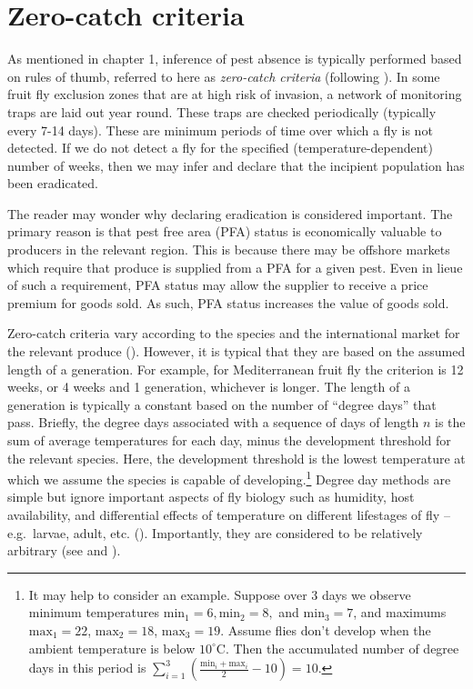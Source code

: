\documentclass[
  oneside]{book}
\begin{document}
\hypertarget{zero-catch-criteria}{%
\section{Zero-catch criteria}\label{zero-catch-criteria}}

As mentioned in chapter 1, inference of pest absence is typically performed based on rules of thumb, referred to here as \emph{zero-catch criteria} (following \citet{meats2005}). In some fruit fly exclusion zones that are at high risk of invasion, a network of monitoring traps are laid out year round. These traps are checked periodically (typically every 7-14 days). These are minimum periods of time over which a fly is not detected. If we do not detect a fly for the specified (temperature-dependent) number of weeks, then we may infer and declare that the incipient population has been eradicated.

The reader may wonder why declaring eradication is considered important. The primary reason is that pest free area (PFA) status is economically valuable to producers in the relevant region. This is because there may be offshore markets which require that produce is supplied from a PFA for a given pest. Even in lieue of such a requirement, PFA status may allow the supplier to receive a price premium for goods sold. As such, PFA status increases the value of goods sold.

Zero-catch criteria vary according to the species and the international market for the relevant produce (\citet{meats2005}). However, it is typical that they are based on the assumed length of a generation. For example, for Mediterranean fruit fly the criterion is 12 weeks, or 4 weeks and 1 generation, whichever is longer. The length of a generation is typically a constant based on the number of ``degree days'' that pass. Briefly, the degree days associated with a sequence of days of length \(n\) is the sum of average temperatures for each day, minus the development threshold for the relevant species. Here, the development threshold is the lowest temperature at which we assume the species is capable of developing.\footnote{It may help to consider an example. Suppose over 3 days we observe minimum temperatures \(\mathrm{min}_1 = 6, \mathrm{min}_2 = 8,\) and \(\mathrm{min}_3 = 7\), and maximums \(\mathrm{max}_1 = 22\), \(\mathrm{max}_2 = 18\), \(\mathrm{max}_3 = 19\). Assume flies don't develop when the ambient temperature is below \(10^\circ \mathrm{C}\). Then the accumulated number of degree days in this period is \(\sum_{i=1}^3 \left(\frac{\mathrm{min}_i + \mathrm{max}_i}{2} - 10\right) = 10\).} Degree day methods are simple but ignore important aspects of fly biology such as humidity, host availability, and differential effects of temperature on different lifestages of fly -- e.g.~larvae, adult, etc. (\citet{collier2017}). Importantly, they are considered to be relatively arbitrary (see \citet{meats2005} and \citet{collier2017}).
\end{document}
